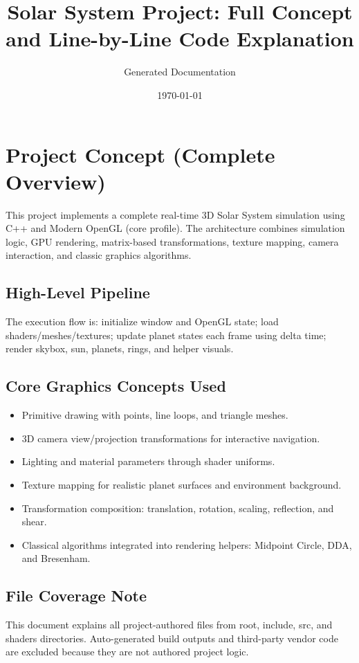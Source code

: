 \documentclass[11pt,a4paper]{article}
\title{Solar System Project: Full Concept and Line-by-Line Code Explanation}
\author{Generated Documentation}
\date{\today}
\begin{document}
\maketitle
\tableofcontents
\newpage

\section{Project Concept (Complete Overview)}
This project implements a complete real-time 3D Solar System simulation using C++ and Modern OpenGL (core profile).
The architecture combines simulation logic, GPU rendering, matrix-based transformations, texture mapping, camera interaction, and classic graphics algorithms.

\subsection{High-Level Pipeline}
The execution flow is: initialize window and OpenGL state; load shaders/meshes/textures; update planet states each frame using delta time; render skybox, sun, planets, rings, and helper visuals.

\subsection{Core Graphics Concepts Used}
\begin{itemize}
\item Primitive drawing with points, line loops, and triangle meshes.
\item 3D camera view/projection transformations for interactive navigation.
\item Lighting and material parameters through shader uniforms.
\item Texture mapping for realistic planet surfaces and environment background.
\item Transformation composition: translation, rotation, scaling, reflection, and shear.
\item Classical algorithms integrated into rendering helpers: Midpoint Circle, DDA, and Bresenham.
\end{itemize}

\subsection{File Coverage Note}
This document explains all project-authored files from root, include, src, and shaders directories.
Auto-generated build outputs and third-party vendor code are excluded because they are not authored project logic.
\end{document}

